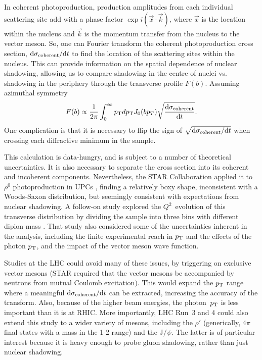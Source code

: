 \documentclass[../report.tex]{subfiles}
\begin{document}
\label{sec:nuclimage}
In coherent photoproduction, production amplitudes from each individual scattering site add with a phase factor $\exp{i(\vec{x}\cdot\vec{k})}$, where $\vec{x}$ is the location within the nucleus and $\vec{k}$ is the momentum transfer from the nucleus to the vector meson.  So, one can Fourier transform the coherent photoproduction cross section, $\mathrm{d}\sigma_{\rm coherent}/\mathrm{d} t$ to find the location of the scattering sites within the nucleus.  This can provide information on the spatial dependence of nuclear shadowing, allowing us to compare shadowing in the centre of nuclei vs. shadowing in the periphery through the transverse profile $F(b)$.   Assuming azimuthal symmetry \cite{Diehl,Toll:2012mb}
\begin{equation}
F(b) \propto \frac{1}{2\pi} \int_0^\infty  p\sb{\scriptstyle\mathrm{T}} dp\sb{\scriptstyle\mathrm{T}} J_0(b p_T) \sqrt{\frac{\mathrm{d}\sigma_{\rm coherent}}{\mathrm{d} t}}.
\end{equation}
One complication is that it is necessary to flip the sign of $\sqrt{\mathrm{d}\sigma_{\rm coherent}/\mathrm{d} t}$ when crossing each diffractive minimum in the sample.

This calculation is  data-hungry, and is subject to a number of theoretical uncertainties.  It is also necessary to separate the cross section into its coherent and incoherent components.  Nevertheless, the STAR Collaboration applied it to $\rho^0$ photoproduction in UPCs \cite{Adamczyk:2017vfu}, finding a relatively boxy shape, inconsistent with a Woods-Saxon distribution, but seemingly consistent with expectations from nuclear shadowing.   A follow-on study explored the  $Q^2$~evolution of this transverse distribution by dividing the sample into three bins with different dipion mass \cite{Klein:2018grn}.  That study also considered some of the uncertainties inherent in the analysis, including the finite experimental reach in $p\sb{\scriptstyle\mathrm{T}}$ and the effects of the photon $p\sb{\scriptstyle\mathrm{T}}$, and the impact of the vector meson wave function. 

Studies at the LHC could avoid many of these issues, by triggering on exclusive vector mesons (STAR required that the vector mesons be accompanied by neutrons from mutual Coulomb excitation).  This would expand the $p\sb{\scriptstyle\mathrm{T}}$ range where a meaningful $\mathrm{d} \sigma_{\rm coherent}/\mathrm{d} t$ can be extracted, increasing the accuracy of the transform.  Also, because of the higher beam energies, the photon~$p\sb{\scriptstyle\mathrm{T}}$ is less important than it is at RHIC.    More importantly, LHC Run~3 and 4 could also extend this study to a wider variety of mesons, including the $\rho'$ (generically, $4\pi$ final states with a mass in the 1-2 \UGeVcc range) and the J$/\psi$.  The latter is of particular interest because it is heavy enough to probe gluon shadowing, rather than just nuclear shadowing.  
\end{document}
